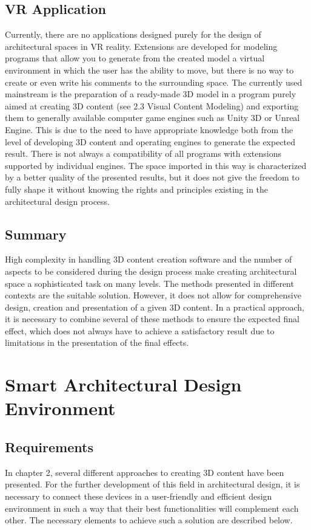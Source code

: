 \documentclass[runningheads]{llncs}
\begin{document}
\subsection{VR Application}
Currently, there are no applications designed purely for the design of architectural spaces in VR reality.
Extensions are developed for modeling programs that allow you to generate from the created model a virtual environment in which the user has the ability to move, but there is no way to create or even write his comments to the surrounding space. The currently used mainstream is the preparation of a ready-made 3D model in a program purely aimed at creating 3D content (see 2.3 Visual Content Modeling) and exporting them to generally available computer game engines such as Unity 3D or Unreal Engine. This is due to the need to have appropriate knowledge both from the level of developing 3D content and operating engines to generate the expected result. There is not always a compatibility of all programs with extensions supported by individual engines. The space imported in this way is characterized by a better quality of the presented results, but it does not give the freedom to fully shape it without knowing the rights and principles existing in the architectural design process.

\subsection{Summary}
High complexity in handling 3D content creation software and the number of aspects to be considered during the design process make creating architectural space a sophisticated task on many levels. The methods presented in different contexts are the suitable solution. However, it does not allow for comprehensive design, creation and presentation of a given 3D content. In a practical approach, it is necessary to combine several of these methods to ensure the expected final effect, which does not always have to achieve a satisfactory result due to limitations in the presentation of the final effects.

\section{Smart Architectural Design Environment}

\subsection{Requirements}
In chapter 2, several different approaches to creating 3D content have been presented. For the further development of this field in architectural design, it is necessary to connect these devices in a user-friendly and efficient design environment in such a way that their best functionalities will complement each other. The necessary elements to achieve such a solution are described below.\\
\end{document}
